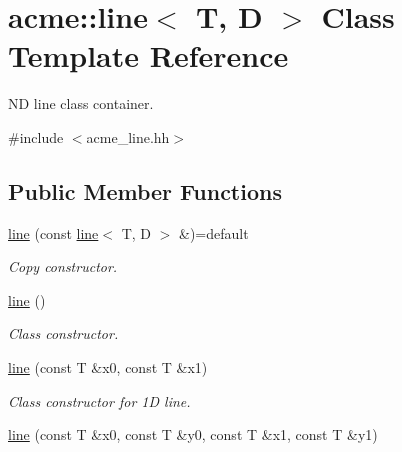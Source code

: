 \hypertarget{classacme_1_1line}{}\section{acme\+:\+:line$<$ T, D $>$ Class Template Reference}
\label{classacme_1_1line}


ND line class container.  




{\ttfamily \#include $<$acme\+\_\+line.\+hh$>$}

\subsection*{Public Member Functions}
\begin{DoxyCompactItemize}
\item 
\mbox{\label{classacme_1_1line_a555932cc3f452737d1aa61c2af242b69}} 
\hyperlink{classacme_1_1line_a555932cc3f452737d1aa61c2af242b69}{line} (const \hyperlink{classacme_1_1line}{line}$<$ T, D $>$ \&)=default
\begin{DoxyCompactList}\small\item\em Copy constructor. \end{DoxyCompactList}\item 
\mbox{\label{classacme_1_1line_ae9f3392847349a6c190802578f173c9f}} 
\hyperlink{classacme_1_1line_ae9f3392847349a6c190802578f173c9f}{line} ()
\begin{DoxyCompactList}\small\item\em Class constructor. \end{DoxyCompactList}\item 
\mbox{\label{classacme_1_1line_abc3cd931146b40760132fa7c587b0a02}} 
\hyperlink{classacme_1_1line_abc3cd931146b40760132fa7c587b0a02}{line} (const T \&x0, const T \&x1)
\begin{DoxyCompactList}\small\item\em Class constructor for 1D line. \end{DoxyCompactList}\item 
\mbox{\label{classacme_1_1line_a3e1dbc7f43e0cd44616b9394c594d516}} 
\hyperlink{classacme_1_1line_a3e1dbc7f43e0cd44616b9394c594d516}{line} (const T \&x0, const T \&y0, const T \&x1, const T \&y1)

\end{DoxyCompactItemize}
